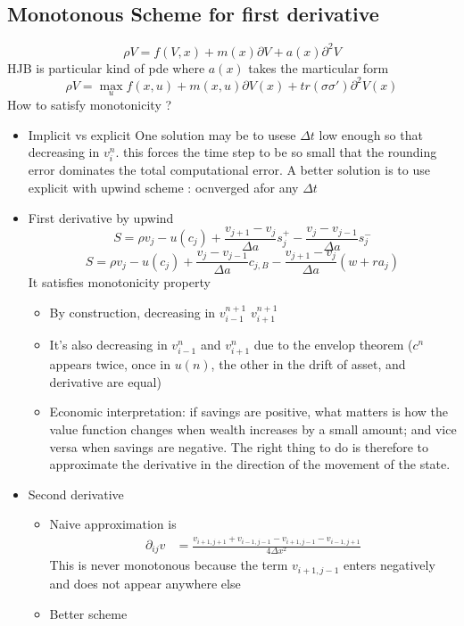 \documentclass[english]{article}
\begin{document}
\subsection{Monotonous Scheme for first derivative}
$$\rho V = f(V, x) + m(x) \partial V + a(x) \partial^2V$$ 
HJB is particular kind of pde where $a(x)$ takes the marticular form
$$\rho V = \max_{u} f(x, u) + m(x, u) \partial V(x) + tr(\sigma \sigma') \partial^2 V(x)$$
How to satisfy monotonicity ?
\begin{itemize}
	\item Implicit vs explicit One solution may be to usese $\Delta t$ low enough so that decreasing in $v_{i}^{n}$. this forces the time step to be so small	that the rounding error dominates the total computational error.
	A better solution is to use explicit with upwind scheme : ocnverged afor any $\Delta t$
	\item First derivative by upwind
	$$S = \rho v_j - u(c_j) + \frac{v_{j+1}-v_{j}}{\Delta a} s_{j}^+ - \frac{v_j-v_{j-1}}{\Delta a} s_{j}^-$$
	$$S = \rho v_j - u(c_j) + \frac{v_j-v_{j-1}}{\Delta a} c_{j, B} - \frac{v_{j+1}-v_j}{\Delta a} (w + ra_j)$$
	It satisfies monotonicity property
	\begin{itemize}
		\item By construction, decreasing in $v_{i-1}^{n+1}$ $v_{i+1}^{n+1}$
		\item It's also decreasing in $v_{i-1}^{n}$ and $v_{i+1}^{n}$ due to the envelop theorem ($c^n$ appears twice, once in $u(n)$, the other in the drift of asset, and derivative are equal)
		\item  Economic interpretation: if savings are positive, what matters is how the value function changes when wealth increases by a small amount; and vice versa when savings are negative. The right thing to do is therefore to approximate the derivative in the direction of the movement of the state.
	\end{itemize}
	\item Second derivative
	\begin{itemize}
		\item Naive approximation is
		\begin{align*}
			\partial_{ij}v&=\frac{v_{i+1, j+1} + v_{i-1, j-1} - v_{i+1, j-1} - v_{i-1, j+1}}{4\Delta x^2}
		\end{align*}
		This is never monotonous because the term $v_{i+1, j-1}$ enters negatively and does not appear anywhere else
		\item Better scheme
		\begin{itemize}

\end{itemize}
\end{itemize}
\end{itemize}
\end{document}
